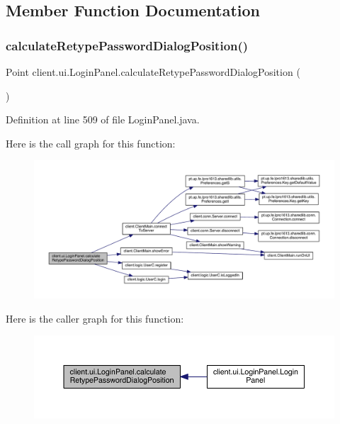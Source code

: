 \subsection{Member Function Documentation}
\hypertarget{classclient_1_1ui_1_1_login_panel_a9726aa2bc3416aa22ad43d2b4b9eed70}{}\label{classclient_1_1ui_1_1_login_panel_a9726aa2bc3416aa22ad43d2b4b9eed70} 
\subsubsection{\texorpdfstring{calculate\+Retype\+Password\+Dialog\+Position()}{calculateRetypePasswordDialogPosition()}}
{\footnotesize\ttfamily Point client.\+ui.\+Login\+Panel.\+calculate\+Retype\+Password\+Dialog\+Position (\begin{DoxyParamCaption}{ }\end{DoxyParamCaption})}



Definition at line 509 of file Login\+Panel.\+java.

Here is the call graph for this function\+:
\nopagebreak
\begin{figure}[H]
\begin{center}
\leavevmode
\includegraphics[width=350pt]{classclient_1_1ui_1_1_login_panel_a9726aa2bc3416aa22ad43d2b4b9eed70_cgraph}
\end{center}
\end{figure}
Here is the caller graph for this function\+:
\nopagebreak
\begin{figure}[H]
\begin{center}
\leavevmode
\includegraphics[width=350pt]{classclient_1_1ui_1_1_login_panel_a9726aa2bc3416aa22ad43d2b4b9eed70_icgraph}
\end{center}
\end{figure}


